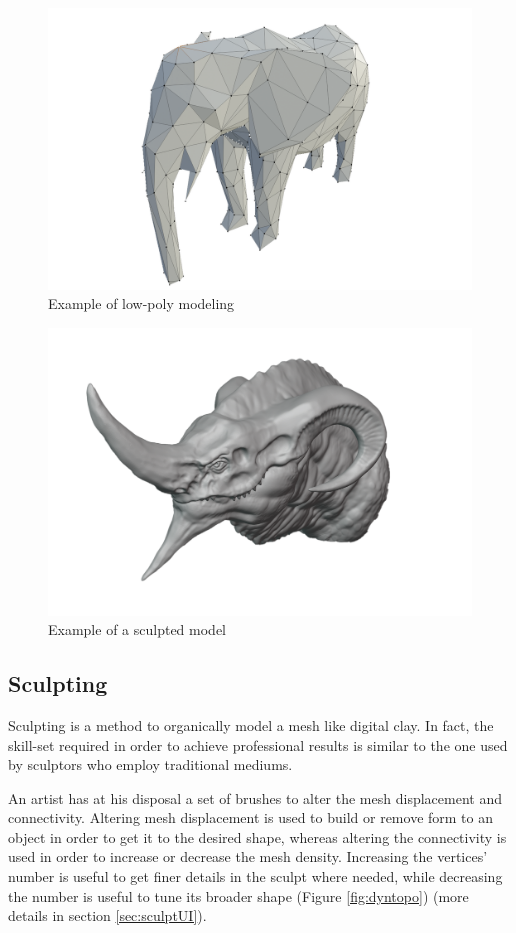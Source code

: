 \documentclass[12pt,twoside]{report}
\begin{document}
\begin{figure}[hp]
    \centering
    \includegraphics[width=45ex]{graphics/polyModeling_ex.png}
    \caption[Example of low-poly modeling]{Example of low-poly modeling \hspace{15ex} \\  }
    
    \label{fig:polyModeling}
\end{figure}
\begin{figure}[hp]
    \centering
    \includegraphics[width=45ex]{graphics/sculpt_ex.png}
    \caption[Example of a sculpted model]{Example of a sculpted model \hspace{15ex} \\  }
    \label{fig:sculpt}
\end{figure}

\subsection{Sculpting}
\label{subsec:sculpting}
Sculpting is a method to organically model a mesh like digital clay. In fact, the skill-set required in order to achieve professional results is similar to the one used by sculptors who employ traditional mediums.

An artist has at his disposal a set of brushes to alter the mesh displacement and connectivity. Altering mesh displacement is used to build or remove form to an object in order to get it to the desired shape, whereas altering the connectivity is used in order to increase or decrease the mesh density. Increasing the vertices' number is useful to get finer details in the sculpt where needed, while decreasing the number is useful to tune its broader shape (Figure \ref{fig:dyntopo}) (more details in section \ref{sec:sculptUI}).
\end{document}
